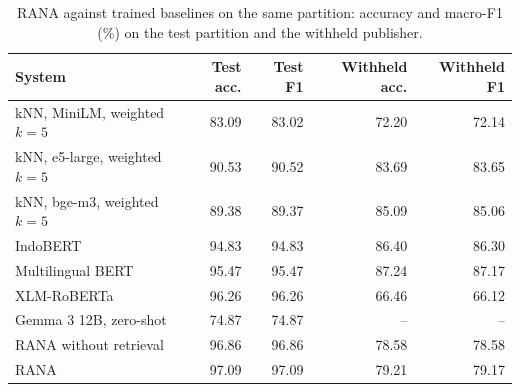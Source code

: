 \begin{table}[t]
\renewcommand{\tblwidth}{\textwidth}%
\small
\centering
\caption{RANA against trained baselines on the same partition: accuracy and macro-F1 (\%) on the test partition and the withheld publisher.}\label{tbl_sota}
\begin{tabular*}{\tblwidth}{@{\extracolsep{\fill}}LRRRR@{}}
\toprule
\textbf{System} & \textbf{Test acc.} & \textbf{Test F1} & \textbf{Withheld acc.} & \textbf{Withheld F1} \\
\midrule
kNN, MiniLM, weighted $k=5$ & 83.09 & 83.02 & 72.20 & 72.14 \\
kNN, e5-large, weighted $k=5$ & 90.53 & 90.52 & 83.69 & 83.65 \\
kNN, bge-m3, weighted $k=5$ & 89.38 & 89.37 & 85.09 & 85.06 \\
IndoBERT & 94.83 & 94.83 & 86.40 & 86.30 \\
Multilingual BERT & 95.47 & 95.47 & 87.24 & 87.17 \\
XLM-RoBERTa & 96.26 & 96.26 & 66.46 & 66.12 \\
Gemma 3 12B, zero-shot & 74.87 & 74.87 & -- & -- \\
RANA without retrieval & 96.86 & 96.86 & 78.58 & 78.58 \\
RANA & 97.09 & 97.09 & 79.21 & 79.17 \\
\bottomrule
\end{tabular*}
\end{table}
